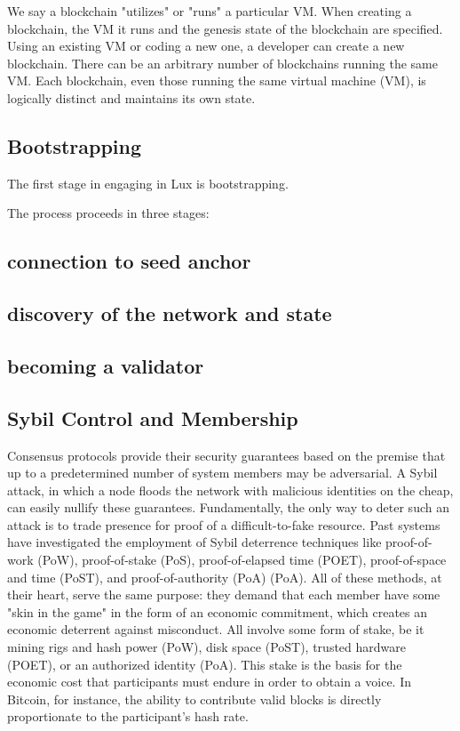 \documentclass[11pt]{article}
\begin{document}
We say a blockchain "utilizes" or "runs" a particular VM. When creating a blockchain, the VM it runs and the genesis state of the blockchain are specified. Using an existing VM or coding a new one, a developer can create a new blockchain. There can be an arbitrary number of blockchains running the same VM. Each blockchain, even those running the same virtual machine (VM), is logically distinct and maintains its own state.


\subsection{Bootstrapping}

The first stage in engaging in Lux is bootstrapping.


The process proceeds in three stages:


\subsection{connection to seed anchor}

\subsection{discovery of the network and state}

\subsection{becoming a validator}

\subsection{Sybil Control and Membership}

Consensus protocols provide their security guarantees based on the premise that up to a predetermined number of system members may be adversarial. A Sybil attack, in which a node floods the network with malicious identities on the cheap, can easily nullify these guarantees. Fundamentally, the only way to deter such an attack is to trade presence for proof of a difficult-to-fake resource. Past systems have investigated the employment of Sybil deterrence techniques like proof-of-work (PoW), proof-of-stake (PoS), proof-of-elapsed time (POET), proof-of-space and time (PoST), and proof-of-authority (PoA) (PoA). All of these methods, at their heart, serve the same purpose: they demand that each member have some "skin in the game" in the form of an economic commitment, which creates an economic deterrent against misconduct. All involve some form of stake, be it mining rigs and hash power (PoW), disk space (PoST), trusted hardware (POET), or an authorized identity (PoA). This stake is the basis for the economic cost that participants must endure in order to obtain a voice. In Bitcoin, for instance, the ability to contribute valid blocks is directly proportionate to the participant's hash rate.
\end{document}
